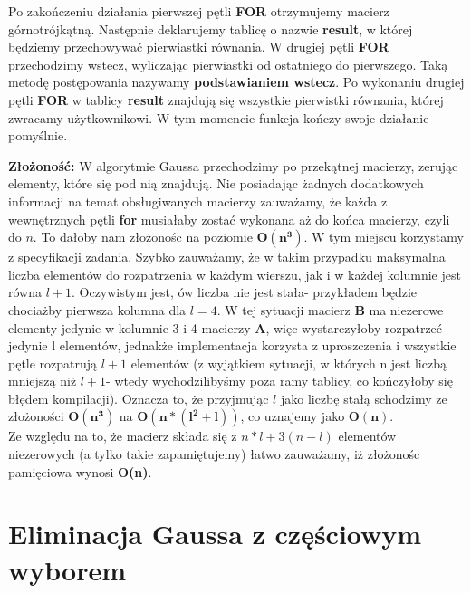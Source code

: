 \documentclass[a4paper,14pt]{report}
\begin{document}
  Po zakończeniu działania pierwszej pętli \textbf{FOR} otrzymujemy macierz górnotrójkątną. Następnie deklarujemy tablicę o nazwie \textbf{result}, w której będziemy przechowywać pierwiastki równania. W drugiej pętli \textbf{FOR} przechodzimy wstecz, wyliczając pierwiastki od ostatniego do pierwszego. Taką metodę postępowania nazywamy \textbf{podstawianiem wstecz}.
  Po wykonaniu drugiej pętli \textbf{FOR} w tablicy \textbf{result} znajdują się wszystkie pierwistki równania, której zwracamy użytkownikowi. W tym momencie funkcja kończy swoje działanie pomyślnie.

  \textbf{Złożoność:}
  W algorytmie Gaussa przechodzimy po przekątnej macierzy, zerując elementy, które się pod nią znajdują. Nie posiadając żadnych dodatkowych informacji na temat obsługiwanych macierzy zauważamy, że każda z wewnętrznych pętli \textbf{for} musiałaby zostać wykonana aż do końca macierzy, czyli do $n$. To dałoby nam złożonośc na poziomie $\mathbf{O(n^{3})}$. W tym miejscu korzystamy z specyfikacji zadania. Szybko zauważamy, że w takim przypadku maksymalna liczba elementów do rozpatrzenia w każdym wierszu, jak i w każdej kolumnie jest równa $l+1$. Oczywistym jest, ów liczba nie jest stała- przykładem będzie chociażby pierwsza kolumna dla $l=4$. W tej sytuacji macierz \textbf{B} ma niezerowe elementy jedynie w kolumnie 3 i 4 macierzy \textbf{A}, więc wystarczyłoby rozpatrzeć jedynie l elementów, jednakże implementacja korzysta z uproszczenia i wszystkie pętle rozpatrują $l+1$ elementów (z wyjątkiem sytuacji, w których n jest liczbą mniejszą niż $l+1$- wtedy wychodzilibyśmy poza ramy tablicy, co kończyłoby się błędem kompilacji). Oznacza to, że przyjmując $l$ jako liczbę stałą schodzimy ze złożoności $\mathbf{O(n^{3})}$ na $\mathbf{O(n*(l^{2}+l))}$, co uznajemy jako $\mathbf{O(n)}$. \\
  Ze względu na to, że macierz składa się z $n*l+3(n-l)$ elementów niezerowych (a tylko takie zapamiętujemy) łatwo zauważamy, iż złożonośc pamięciowa wynosi \textbf{O(n)}. 





\chapter{Eliminacja Gaussa z częściowym wyborem}
\end{document}
